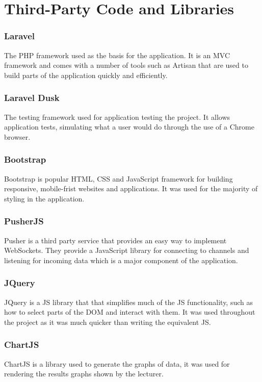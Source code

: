 \chapter{Third-Party Code and Libraries}
\subsection{Laravel}
The PHP framework used as the basis for the application\cite{laravel}. It is an MVC framework and comes with a number of tools such as Artisan\cite{artisan} that are used to build parts of the application quickly and efficiently.
\subsection{Laravel Dusk}
The testing framework used for application testing the project. It allows application tests, simulating what a user would do through the use of a Chrome browser.
\subsection{Bootstrap}
Bootstrap is popular HTML, CSS and JavaScript framework for building responsive, mobile-frist websites and applications\cite{bootstrap}. It was used for the majority of styling in the application.
\subsection{PusherJS}
Pusher is a third party service that provides an easy way to implement WebSockets\cite{pusher-what-is}. They provide a JavaScript library for connecting to channels and listening for incoming data which is a major component of the application.
\subsection{JQuery}
JQuery is a JS library that that simplifies much of the JS functionality, such as how to select parts of the DOM and interact with them\cite{jquery}. It was used throughout the project as it was much quicker than writing the equivalent JS.
\subsection{ChartJS}
ChartJS is a library used to generate the graphs of data, it was used for rendering the results graphs shown by the lecturer\cite{chartjs}.